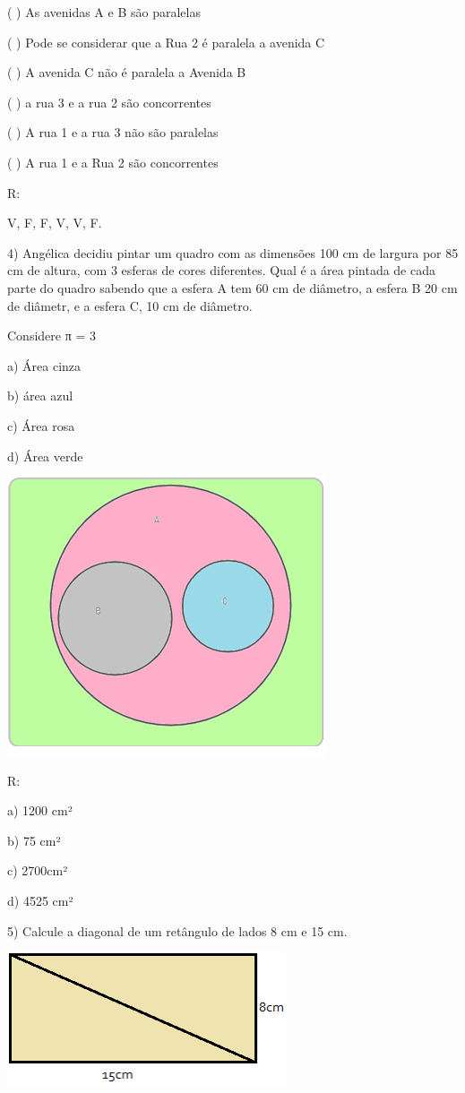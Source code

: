 ( ) As avenidas A e B são paralelas

( ) Pode se considerar que a Rua 2 é paralela a avenida C

( ) A avenida C não é paralela a Avenida B

( ) a rua 3 e a rua 2 são concorrentes

( ) A rua 1 e a rua 3 não são paralelas

( ) A rua 1 e a Rua 2 são concorrentes

R:

V, F, F, V, V, F.

4) Angélica decidiu pintar um quadro com as dimensões 100 cm de largura
por 85 cm de altura, com 3 esferas de cores diferentes. Qual é a área
pintada de cada parte do quadro sabendo que a esfera A tem 60 cm de
diâmetro, a esfera B 20 cm de diâmetr, e a esfera C, 10 cm de diâmetro.

Considere π = 3

a) Área cinza

b) área azul

c) Área rosa

d) Área verde

\includegraphics[width=3.70833in,height=3.22917in]{./imgSAEB_6_MAT/media/image54.png}

R:

a) 1200 cm²

b) 75 cm²

c) 2700cm²

d) 4525 cm²

5) Calcule a diagonal de um retângulo de lados 8 cm e 15 cm.

\includegraphics[width=3.24444in,height=1.54653in]{./imgSAEB_6_MAT/media/image55.png}

